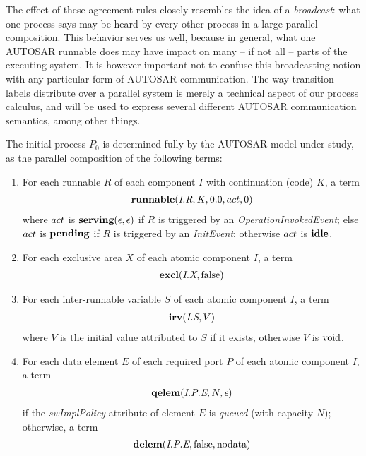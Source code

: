 \documentclass[twocolumn]{article}
\begin{document}
The effect of these agreement rules closely resembles the idea of a \emph{broadcast}: what one process says may be heard by every other process in a large parallel composition. This behavior serves us well, because in general, what one AUTOSAR runnable does may have impact on many -- if not all -- parts of the executing system. It is however important not to confuse this broadcasting notion with any particular form of AUTOSAR communication. The way transition labels distribute over a parallel system is merely a technical aspect of our process calculus, and will be used to express several different AUTOSAR communication semantics, among other things.

The initial process $P_0$ is determined fully by the AUTOSAR model under study, as the parallel composition of the following terms:
\begin{enumerate}

\item For each runnable $R$ of each component $I$ with continuation (code) $K$, a term
\[
\begin{array}{c}
  \Trunnable{\Tr{R}{I}}{K}{0.0}{\Act}{0}
\end{array}
\]
where $\Act$ is $\Tserving{\epsilon}{\epsilon}$ if $R$ is triggered by an \emph{OperationInvokedEvent}; else $\Act$ is $\Tpending$ if $R$ is triggered by an \emph{InitEvent}; otherwise $\Act$ is $\Tidle$.

\item For each exclusive area $X$ of each atomic component $I$, a term
\[
\begin{array}{c}
  \Texcl{\Tx{X}{I}}{\Tfalse}
\end{array}
\]

\item For each inter-runnable variable $S$ of each atomic component $I$, a term
\[
\begin{array}{c}
  \Tirv{\Ts{S}{I}}{V}
\end{array}
\]
where $V$ is the initial value attributed to $S$ if it exists, otherwise $V$ is $\Tvoid$.

\item For each data element $E$ of each required port $P$ of each atomic component $I$, a term
\[
\begin{array}{c}
  \Tqelem{\Tep{E}{P}{I}}{N}{\epsilon}
\end{array}
\]
if the \emph{swImplPolicy} attribute of element $E$ is \emph{queued} (with capacity $N$); otherwise, a term
\[
\begin{array}{c}
  \Tdelem{\Tep{E}{P}{I}}{\Tfalse}{\text{nodata}}
\end{array}
\]


\end{enumerate}
\end{document}
